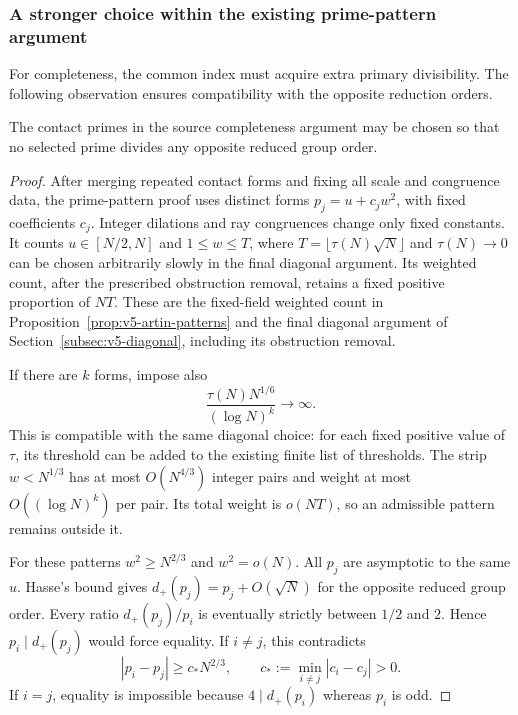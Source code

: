 \subsubsection{A stronger choice within the existing prime-pattern argument}
For completeness, the common index must acquire extra primary divisibility. The following observation ensures compatibility with the opposite reduction orders.

\begin{lemma}\label{v9:lem:separation}
The contact primes in the source completeness argument may be chosen so that no selected prime divides any opposite reduced group order.
\end{lemma}
\begin{proof}
After merging repeated contact forms and fixing all scale and congruence data, the prime-pattern proof uses distinct forms $p_j=u+c_jw^2$, with fixed coefficients $c_j$. Integer dilations and ray congruences change only fixed constants. It counts $u\in[N/2,N]$ and $1\le w\le T$, where $T=\lfloor\tau(N)\sqrt N\rfloor$ and $\tau(N)\to0$ can be chosen arbitrarily slowly in the final diagonal argument. Its weighted count, after the prescribed obstruction removal, retains a fixed positive proportion of $NT$. These are the fixed-field weighted count in Proposition~\ref{prop:v5-artin-patterns} and the final diagonal argument of Section~\ref{subsec:v5-diagonal}, including its obstruction removal.

If there are $k$ forms, impose also
\[
 \frac{\tau(N)N^{1/6}}{(\log N)^k}\longrightarrow\infty.
\]
This is compatible with the same diagonal choice: for each fixed positive value of $\tau$, its threshold can be added to the existing finite list of thresholds. The strip $w<N^{1/3}$ has at most $O(N^{4/3})$ integer pairs and weight at most $O((\log N)^k)$ per pair. Its total weight is $o(NT)$, so an admissible pattern remains outside it.

For these patterns $w^2\ge N^{2/3}$ and $w^2=o(N)$. All $p_j$ are asymptotic to the same $u$. Hasse's bound \cite[Theorem V.1.1, p. 138]{silverman} gives $d_+(p_j)=p_j+O(\sqrt N)$ for the opposite reduced group order. Every ratio $d_+(p_j)/p_i$ is eventually strictly between $1/2$ and $2$. Hence $p_i\mid d_+(p_j)$ would force equality. If $i\ne j$, this contradicts
\[
 |p_i-p_j|\ge c_*N^{2/3},\qquad
 c_*:=\min_{i\ne j}|c_i-c_j|>0.
\]
If $i=j$, equality is impossible because $4\mid d_+(p_i)$ whereas $p_i$ is odd.
\end{proof}

